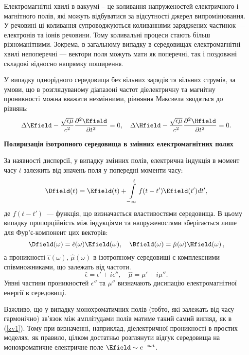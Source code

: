 \begin{Theory}
	Електромагнітні хвилі в вакуумі -- це коливання напруженостей електричного і магнітного полів, які
	можуть відбуватися  за відсутності джерел випромінювання. У речовині ці коливання
	супроводжуються коливаннями  заряджених частинок --- електронів та іонів речовини. Тому коливальні
	процеси стають більш різноманітними. Зокрема, в загальному випадку в середовищах електромагнітні
	хвилі непоперечні --- вектори поля можуть мати як поперечні, так і поздовжні складові відносно
	напрямку поширення.

	У випадку однорідного середовища без вільних зарядів та вільних струмів,  за умови, що в
	розглядуваному діапазоні частот діелектричну та
	магнітну проникності можна вважати незмінними, рівняння Максвела зводяться до рівнянь:
	\begin{equation}\label{}
		\Delta\Efield - \frac{\sqrt{\epsilon\mu}}{c^2}\frac{\partial^2\Efield}{\partial t^2} = 0, \quad
		\Delta\Hfield - \frac{\sqrt{\epsilon\mu}}{c^2}\frac{\partial^2\Hfield}{\partial t^2} = 0.
	\end{equation}


	\textbf{Поляризація ізотропного середовища в змінних електромагнітних полях}

	За наявності дисперсії, у випадку змінних полів, електрична індукція в момент часу $t$  залежить
	від значень поля у  попередні моменти часу:
	\begin{equation}\label{eq:DtEt}
		\Dfield(t) = \Efield(t) + \int\limits_{-\infty}^t f(t - t')\Efield(t')dt',
	\end{equation}
	де $ f(t - t')$~--- функція, що визначається властивостями середовища. В цьому випадку
	пропорційність між індукціями та напруженостями зберігається лише для Фур'є-компонент цих векторів:
	\begin{equation}\label{zv1}
		\Dfield(\omega) = \hat\epsilon(\omega)\Efield(\omega), \quad \Bfield(\omega) =
		\hat\mu(\omega)\Hfield(\omega)\,,
	\end{equation}
  а проникності  $\hat\epsilon(\omega), \,\hat\mu(\omega)$   в ізотропному середовищі є комплексними
  співмножниками, що залежать від частоти.
  \begin{equation}\label{}
		\hat{\epsilon} = \epsilon' + i\epsilon'', \quad \hat{\mu} = \mu' + i\mu''.
	\end{equation}
	Уявні частини проникностей $\epsilon''$ та $\mu''$ визначають дисипацію електромагнітної енергії в
	середовищі.

  Важливо, що у випадку монохроматичних полів (тобто, які залежать від часу гармонічно) зв'язок між
  амплітудами полів матиме такий самий вигляд, як в (\ref{zv1}). Тому при визначенні, наприклад,
  діелектричної проникності в простих моделях, як правило,   цілком достатньо розглянути відгук
  середовища на  монохроматичне електричне поле $\Efield\sim e^{-i\omega t}$.






\end{Theory}
